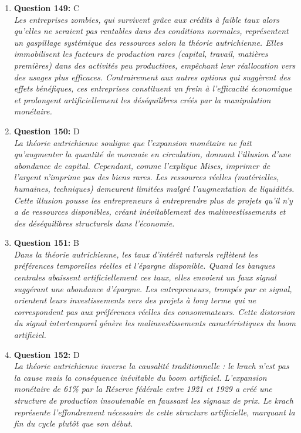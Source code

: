 \documentclass[12pt,a4paper]{article}
\begin{document}
\begin{enumerate}
\item \textbf{Question 149:} C
\\ \textit{Les entreprises zombies, qui survivent grâce aux crédits à faible taux alors qu'elles ne seraient pas rentables dans des conditions normales, représentent un gaspillage systémique des ressources selon la théorie autrichienne. Elles immobilisent les facteurs de production rares (capital, travail, matières premières) dans des activités peu productives, empêchant leur réallocation vers des usages plus efficaces. Contrairement aux autres options qui suggèrent des effets bénéfiques, ces entreprises constituent un frein à l'efficacité économique et prolongent artificiellement les déséquilibres créés par la manipulation monétaire.}

\item \textbf{Question 150:} D
\\ \textit{La théorie autrichienne souligne que l'expansion monétaire ne fait qu'augmenter la quantité de monnaie en circulation, donnant l'illusion d'une abondance de capital. Cependant, comme l'explique Mises, imprimer de l'argent n'imprime pas des biens rares. Les ressources réelles (matérielles, humaines, techniques) demeurent limitées malgré l'augmentation de liquidités. Cette illusion pousse les entrepreneurs à entreprendre plus de projets qu'il n'y a de ressources disponibles, créant inévitablement des malinvestissements et des déséquilibres structurels dans l'économie.}

\item \textbf{Question 151:} B
\\ \textit{Dans la théorie autrichienne, les taux d'intérêt naturels reflètent les préférences temporelles réelles et l'épargne disponible. Quand les banques centrales abaissent artificiellement ces taux, elles envoient un faux signal suggérant une abondance d'épargne. Les entrepreneurs, trompés par ce signal, orientent leurs investissements vers des projets à long terme qui ne correspondent pas aux préférences réelles des consommateurs. Cette distorsion du signal intertemporel génère les malinvestissements caractéristiques du boom artificiel.}

\item \textbf{Question 152:} D
\\ \textit{La théorie autrichienne inverse la causalité traditionnelle : le krach n'est pas la cause mais la conséquence inévitable du boom artificiel. L'expansion monétaire de 61\% par la Réserve fédérale entre 1921 et 1929 a créé une structure de production insoutenable en faussant les signaux de prix. Le krach représente l'effondrement nécessaire de cette structure artificielle, marquant la fin du cycle plutôt que son début.}


\end{enumerate}
\end{document}
